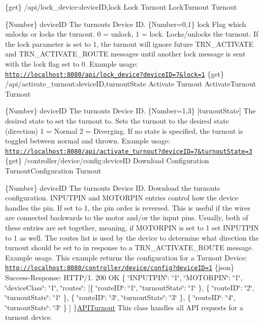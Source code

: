 \{get\} /api/lock\+\_\+device\+:device\+ID,lock Lock Turnout  Lock\+Turnout  Turnout

\{Number\} device\+ID The turnout\textquotesingle{}s Device ID.  \{Number=0,1\} lock Flag which unlocks or locks the turnout. 0 = unlock, 1 = lock.  Locks/unlocks the turnout. If the lock parameter is set to 1, the turnout will ignore future T\+R\+N\+\_\+\+A\+C\+T\+I\+V\+A\+TE and T\+R\+N\+\_\+\+A\+C\+T\+I\+V\+A\+T\+E\+\_\+\+R\+O\+U\+TE messages until another lock message is sent with the lock flag set to 0.  Example usage\+: \href{http://localhost:8080/api/lock_device?deviceID=7&lock=1}{\tt http\+://localhost\+:8080/api/lock\+\_\+device?device\+I\+D=7\&lock=1}  \{get\} /api/activate\+\_\+turnout\+:device\+ID,turnout\+State Activate Turnout  Activate\+Turnout  Turnout

\{Number\} device\+ID The turnout\textquotesingle{}s Device ID.  \{Number=1,3\} \mbox{[}turnout\+State\mbox{]} The desired state to set the turnout to.  Sets the turnout to the desired state (direction) 1 = Normal 2 = Diverging. If no state is specified, the turnout is toggled between normal and thrown.  Example usage\+: \href{http://localhost:8080/api/activate_turnout?deviceID=7&turnoutState=3}{\tt http\+://localhost\+:8080/api/activate\+\_\+turnout?device\+I\+D=7\&turnout\+State=3}  \{get\} /controller/device/config\+:device\+ID Download Configuration  Turnout\+Configuration  Turnout

\{Number\} device\+ID The turnout\textquotesingle{}s Device ID.  Download the turnout\textquotesingle{}s configuration. I\+N\+P\+U\+T\+P\+IN and M\+O\+T\+O\+R\+P\+IN entries control how the device handles the pin. If set to 1, the pin order is reversed. This is useful if the wires are connected backwards to the motor and/or the input pins. Usually, both of these entries are set together, meaning, if M\+O\+T\+O\+R\+P\+IN is set to 1 set I\+N\+P\+U\+T\+P\+IN to 1 as well. The routes list is used by the device to determine what direction the turnout should be set to in response to a T\+R\+N\+\_\+\+A\+C\+T\+I\+V\+A\+T\+E\+\_\+\+R\+O\+U\+TE message.  Example usage. This example returns the configuration for a Turnout Device\+: \href{http://localhost:8080/controller/device/config?deviceID=1}{\tt http\+://localhost\+:8080/controller/device/config?device\+I\+D=1}  \{json\} Success-\/\+Response\+: H\+T\+T\+P/1. 200 OK \{ \char`\"{}\+I\+N\+P\+U\+T\+P\+I\+N\char`\"{}\+: \char`\"{}1\char`\"{}, \char`\"{}\+M\+O\+T\+O\+R\+P\+I\+N\char`\"{}\+: \char`\"{}1\char`\"{}, \char`\"{}device\+Class\char`\"{}\+: \char`\"{}1\char`\"{}, \char`\"{}routes\char`\"{}\+: \mbox{[}\{ \char`\"{}route\+I\+D\char`\"{}\+: \char`\"{}1\char`\"{}, \char`\"{}turnout\+State\char`\"{}\+: \char`\"{}1\char`\"{} \}, \{ \char`\"{}route\+I\+D\char`\"{}\+: \char`\"{}2\char`\"{}, \char`\"{}turnout\+State\char`\"{}\+: \char`\"{}1\char`\"{} \}, \{ \char`\"{}route\+I\+D\char`\"{}\+: \char`\"{}3\char`\"{}, \char`\"{}turnout\+State\char`\"{}\+: \char`\"{}3\char`\"{} \}, \{ \char`\"{}route\+I\+D\char`\"{}\+: \char`\"{}4\char`\"{}, \char`\"{}turnout\+State\char`\"{}\+: \char`\"{}3\char`\"{} \} \mbox{]} \}\hyperlink{class_a_p_i_turnout}{A\+P\+I\+Turnout} This class handles all A\+PI requests for a turnout device. 

